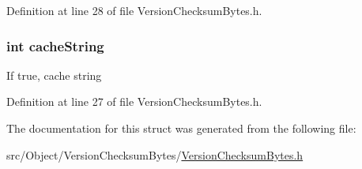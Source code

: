 Definition at line 28 of file VersionChecksumBytes.h.

\hypertarget{struct_version_checksum_bytes_a440754891ba48c34d0ec933efc36e050}{
\subsubsection[{cacheString}]{\setlength{\rightskip}{0pt plus 5cm}int {\bf cacheString}}}
\label{struct_version_checksum_bytes_a440754891ba48c34d0ec933efc36e050}
If true, cache string 

Definition at line 27 of file VersionChecksumBytes.h.



The documentation for this struct was generated from the following file:\begin{DoxyCompactItemize}
\item 
src/Object/VersionChecksumBytes/\hyperlink{_version_checksum_bytes_8h}{VersionChecksumBytes.h}\end{DoxyCompactItemize}
